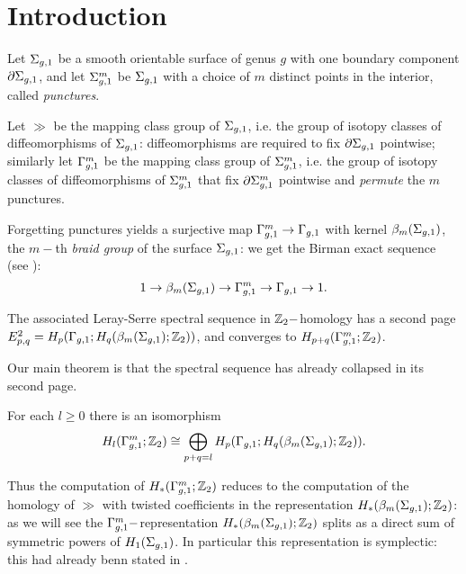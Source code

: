 \section{Introduction}
Let $\Sigma_{g,1}$ be a smooth orientable surface of genus $g$ with one boundary component $\partial\Sigma_{g,1}$, and let $\Sigma_{g,1}^m$ be $\Sigma_{g,1}$ with
a choice of $m$ distinct points in the interior, called \emph{punctures}.

Let $\gg$ be the mapping class group of $\Sigma_{g,1}$, i.e. the group of isotopy classes of diffeomorphisms of $\Sigma_{g,1}$:
diffeomorphisms are required to fix $\partial\Sigma_{g,1}$ pointwise; similarly let $\Gamma_{g,1}^m$ be the mapping class group of $\Sigma_{g,1}^m$, i.e.
the group of isotopy classes of diffeomorphisms of $\Sigma_{g,1}^m$ that fix $\partial\Sigma_{g,1}^m$ pointwise and \emph{permute} the $m$ punctures.

Forgetting punctures yields a surjective map $\Gamma_{g,1}^m\to\Gamma_{g,1}$ with kernel $\beta_{m}(\Sigma_{g,1})$,
the $m-$th \emph{braid group} of the surface $\Sigma_{g,1}$: we get the Birman exact sequence (see \cite{Birman:mcgbr}):
\begin{equation}
\label{eq:Birman}
1\to\beta_{m}(\Sigma_{g,1})\to\Gamma_{g,1}^m\to\Gamma_{g,1}\to 1.
\end{equation}

The associated Leray-Serre spectral sequence in $\mathbb{Z}_2-$homology has a second page $E^2_{p,q}=H_p(\Gamma_{g,1};H_q(\beta_{m}(\Sigma_{g,1});\mathbb{Z}_2))$,
and converges to $H_{p+q}(\Gamma_{g,1}^m;\mathbb{Z}_2)$.

Our main theorem is that the spectral sequence has already collapsed in its second page.
\begin{thm}
\label{thm:main}
For each $l\geq 0$ there is an isomorphism
\begin{equation}
\label{eq:main}
 H_l(\Gamma_{g,1}^m;\mathbb{Z}_2)\cong \bigoplus_{p+q=l} H_p(\Gamma_{g,1};H_q(\beta_{m}(\Sigma_{g,1});\mathbb{Z}_2)).
\end{equation}
\end{thm}
Thus the computation of $H_*(\Gamma_{g,1}^m;\mathbb{Z}_2)$ reduces to the computation of the homology of $\gg$ with
twisted coefficients in the representation $H_*(\beta_{m}(\Sigma_{g,1});\mathbb{Z}_2)$: as we will see the $\Gamma_{g,1}^m-$representation
$H_*(\beta_{m}(\Sigma_{g,1});\mathbb{Z}_2)$ splits as a direct sum of symmetric powers of $H_1(\Sigma_{g,1})$.
In particular this representation is symplectic: this had already benn stated in \cite{LM}.

